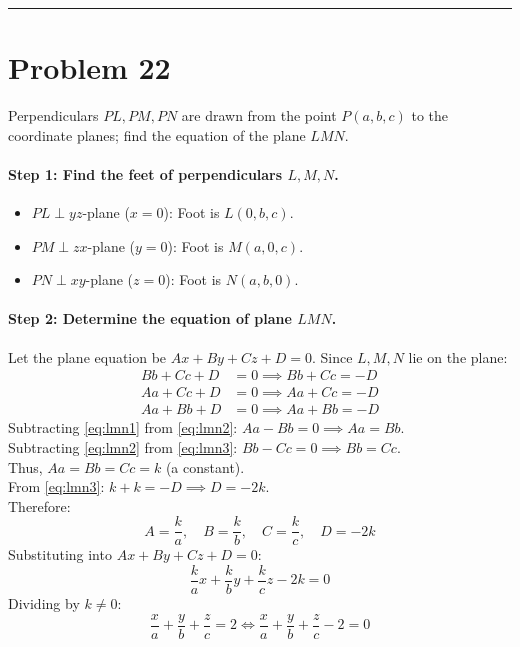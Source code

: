 \documentclass[11pt,a4paper]{article}
\begin{document}
\vspace{0.4cm}
\hrule
\vspace{0.4cm}

\section{Problem 22}
\begin{problembox}[Problem 22]
Perpendiculars $PL, PM, PN$ are drawn from the point $P(a, b, c)$ to the coordinate planes; find the equation of the plane $LMN$.
\end{problembox}

\paragraph{Step 1: Find the feet of perpendiculars $L, M, N$.}
\begin{itemize}
    \item $PL \perp yz$-plane ($x = 0$): Foot is $L(0, b, c)$.
    \item $PM \perp zx$-plane ($y = 0$): Foot is $M(a, 0, c)$.
    \item $PN \perp xy$-plane ($z = 0$): Foot is $N(a, b, 0)$.
\end{itemize}

\paragraph{Step 2: Determine the equation of plane $LMN$.}
Let the plane equation be $Ax + By + Cz + D = 0$. Since $L, M, N$ lie on the plane:
\begin{align}
    B b + C c + D &= 0 \implies B b + C c = -D \label{eq:lmn1}\\
    A a + C c + D &= 0 \implies A a + C c = -D \label{eq:lmn2}\\
    A a + B b + D &= 0 \implies A a + B b = -D \label{eq:lmn3}
\end{align}
Subtracting \eqref{eq:lmn1} from \eqref{eq:lmn2}: $A a - B b = 0 \implies A a = B b$.\\
Subtracting \eqref{eq:lmn2} from \eqref{eq:lmn3}: $B b - C c = 0 \implies B b = C c$.\\
Thus, $A a = B b = C c = k$ (a constant).\\
From \eqref{eq:lmn3}: $k + k = -D \implies D = -2k$.\\
Therefore:
$$A = \frac{k}{a}, \quad B = \frac{k}{b}, \quad C = \frac{k}{c}, \quad D = -2k$$
Substituting into $Ax + By + Cz + D = 0$:
$$\frac{k}{a}x + \frac{k}{b}y + \frac{k}{c}z - 2k = 0$$
Dividing by $k \neq 0$:
$$\frac{x}{a} + \frac{y}{b} + \frac{z}{c} = 2 \iff \frac{x}{a} + \frac{y}{b} + \frac{z}{c} - 2 = 0$$
\end{document}
